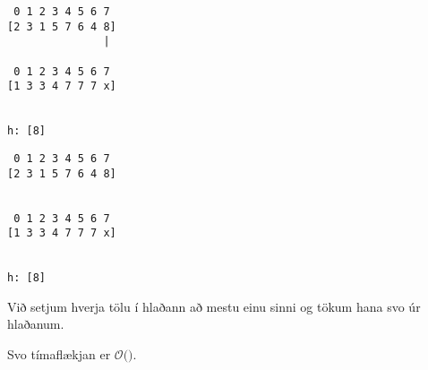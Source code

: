 { \begin{verbatim}
 0 1 2 3 4 5 6 7
[2 3 1 5 7 6 4 8]
               |

 0 1 2 3 4 5 6 7
[1 3 3 4 7 7 7 x]


h: [8]
\end{verbatim} }

{ \begin{verbatim}
 0 1 2 3 4 5 6 7
[2 3 1 5 7 6 4 8]


 0 1 2 3 4 5 6 7
[1 3 3 4 7 7 7 x]


h: [8]
\end{verbatim} }

{
	\only<all:1>{\ngeAA}
	\only<all:2>{\ngeAB}
	\only<all:3>{\ngeAC}
	\only<all:4>{\ngeAD}
	\only<all:5>{\ngeAE}
	\only<all:6>{\ngeAF}
	\only<all:7>{\ngeAG}
	\only<all:8>{\ngeAH}
	\only<all:9>{\ngeAI}
	\only<all:10>{\ngeAJ}
	\only<all:11>{\ngeAK}
	\only<all:12>{\ngeAL}
	\only<all:13>{\ngeAM}
	\only<all:14>{\ngeAN}
	\only<all:15>{\ngeAO}
	\only<all:16>{\ngeAP}
	\only<all:17>{\ngeAQ}
	\only<all:18>{\ngeAR}
	\only<all:19>{\ngeAS}
	\only<all:20>{\ngeAT}
	\only<all:21>{\ngeAU}
	\only<all:22>{\ngeAV}
	\only<all:23>{\ngeAW}
	\only<all:24>{\ngeAX}
	\only<all:25>{\ngeAY}
	\only<all:26>{\ngeAZ}
	\only<all:27>{\ngeBA}
	\only<all:28>{\ngeBB}
	\only<all:29>{\ngeBC}
	\only<all:30>{\ngeBD}
	\only<all:31>{\ngeBE}
	\only<all:32>{\ngeBF}
	\only<all:33>{\ngeBG}
	\only<all:34>{\ngeBH}
	\only<all:35>{\ngeBI}
	\only<all:36>{\ngeBJ}
	\only<all:37>{\ngeBK}
	\only<all:38>{\ngeBL}
	\only<all:39>{\ngeBM}
	\only<all:40>{\ngeBN}
	\only<all:41>{\ngeBO}
	\only<all:42>{\ngeBP}
}

{
}

{

	{
		\item<1-> Við setjum hverja tölu í hlaðann að mestu einu sinni og tökum hana svo úr hlaðanum.
		\item<2-> Svo tímaflækjan er $\mathcal{O}($\onslide<3->{$\,n\,$}$)$.
	}
}

{
}


